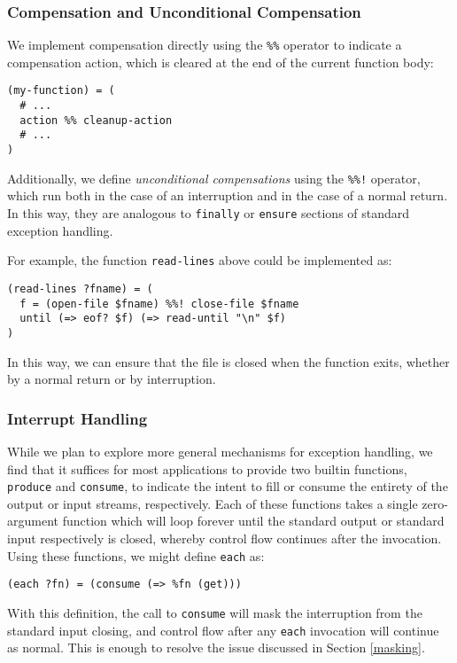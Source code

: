 \documentclass[english,PRO]{ipsj}
\begin{document}
\subsubsection{Compensation and Unconditional Compensation}\noindent
We implement compensation directly using the \verb/%%/ operator to indicate a compensation action, which is cleared at the end of the current function body:
\begin{lstlisting}
(my-function) = (
  # ...
  action %% cleanup-action
  # ...
)
\end{lstlisting}

\noindent Additionally, we define \emph{unconditional compensations} using the \verb/%%!/ operator, which run both in the case of an interruption and in the case of a normal return. In this way, they are analogous to \verb/finally/ or \verb/ensure/ sections of standard exception handling.

For example, the function \verb/read-lines/ above could be implemented as:
\begin{lstlisting}
(read-lines ?fname) = (
  f = (open-file $fname) %%! close-file $fname
  until (=> eof? $f) (=> read-until "\n" $f)
)
\end{lstlisting}

\noindent
In this way, we can ensure that the file is closed when the function exits, whether by a normal return or by interruption.

\subsubsection{Interrupt Handling}\noindent
While we plan to explore more general mechanisms for exception handling, we find that it suffices for most applications to provide two builtin functions, \verb/produce/ and \verb/consume/, to indicate the intent to fill or consume the entirety of the output or input streams, respectively. Each of these functions takes a single zero-argument function which will loop forever until the standard output or standard input respectively is closed, whereby control flow continues after the invocation. Using these functions, we might define \verb/each/ as:
\begin{lstlisting}
(each ?fn) = (consume (=> %fn (get)))
\end{lstlisting}

\noindent
With this definition, the call to \verb/consume/ will mask the interruption from the standard input closing, and control flow after any \verb/each/ invocation will continue as normal. This is enough to resolve the issue discussed in Section \ref{masking}.
\end{document}
